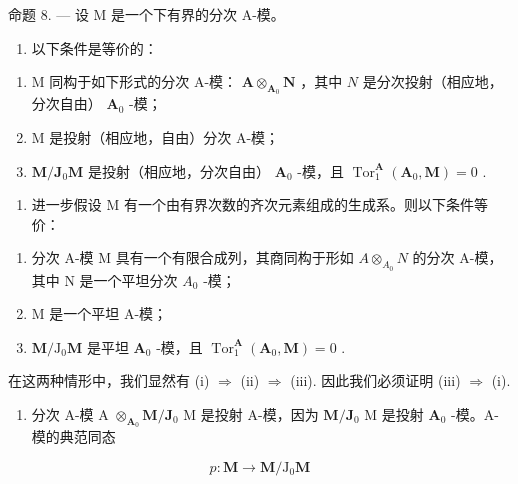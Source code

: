 命题 8. --- 设 M 是一个下有界的分次 A-模。

\begin{enumerate}
\def\labelenumi{\alph{enumi})}
\tightlist
\item
  以下条件是等价的：
\end{enumerate}

\begin{enumerate}
\def\labelenumi{(\roman{enumi})}
\item
  M 同构于如下形式的分次 A-模： \(\mathbf{A} \otimes_{\mathbf{A}_0} \mathbf{N}\) ，其中 \(N\) 是分次投射（相应地，分次自由） \(\mathbf{A}_0\) -模；
\item
  M 是投射（相应地，自由）分次 A-模；
\item
  \(\mathbf{M} / \mathbf{J}_0\mathbf{M}\) 是投射（相应地，分次自由） \(\mathbf{A}_0\) -模，且 \(\operatorname{Tor}_1^{\mathbf{A}}(\mathbf{A}_0,\mathbf{M}) = 0\) .
\end{enumerate}

\begin{enumerate}
\def\labelenumi{\alph{enumi})}
\setcounter{enumi}{1}
\tightlist
\item
  进一步假设 M 有一个由有界次数的齐次元素组成的生成系。则以下条件等价：
\end{enumerate}

\begin{enumerate}
\def\labelenumi{(\roman{enumi})}
\item
  分次 A-模 M 具有一个有限合成列，其商同构于形如 \(A \otimes_{A_{0}} N\) 的分次 A-模，其中 N 是一个平坦分次 \(A_{0}\) -模；
\item
  M 是一个平坦 A-模；
\item
  \(\mathbf{M} / \mathrm{J}_0\mathbf{M}\) 是平坦 \(\mathbf{A}_0\) -模，且 \(\operatorname{Tor}_1^{\mathbf{A}}(\mathbf{A}_0,\mathbf{M}) = 0\) .
\end{enumerate}

在这两种情形中，我们显然有 (i) \(\Rightarrow\) (ii) \(\Rightarrow\) (iii). 因此我们必须证明 (iii) \(\Rightarrow\) (i).

\begin{enumerate}
\def\labelenumi{\alph{enumi})}
\tightlist
\item
  分次 A-模 A \(\otimes_{\mathbf{A}_0}\mathbf{M} / \mathbf{J}_0\) M 是投射 A-模，因为 \(\mathbf{M} / \mathbf{J}_0\) M 是投射 \(\mathbf{A}_0\) -模。A-模的典范同态
\end{enumerate}

\[
p: \mathbf {M} \rightarrow \mathbf {M} / \mathrm{J} _ {0} \mathbf {M}
\]

